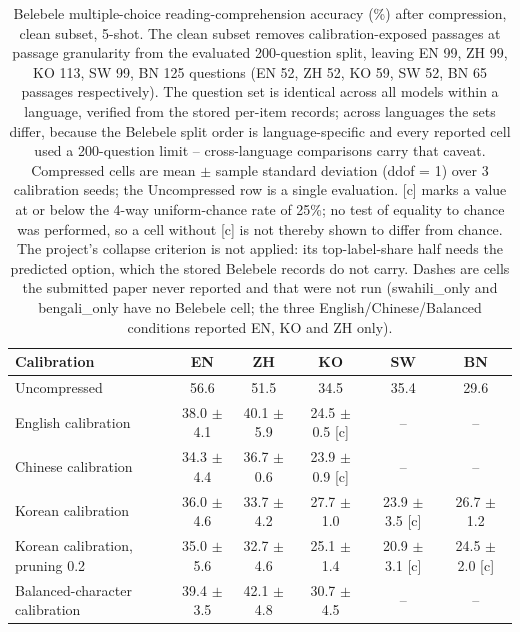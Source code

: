 \begin{table}[t]
\centering
\small
\begin{tabular}{lccccc}
\toprule
Calibration & EN & ZH & KO & SW & BN \\
\midrule
Uncompressed & 56.6 & 51.5 & 34.5 & 35.4 & 29.6 \\
English calibration & 38.0 $\pm$ 4.1 & 40.1 $\pm$ 5.9 & 24.5 $\pm$ 0.5 [c] & -- & -- \\
Chinese calibration & 34.3 $\pm$ 4.4 & 36.7 $\pm$ 0.6 & 23.9 $\pm$ 0.9 [c] & -- & -- \\
Korean calibration & 36.0 $\pm$ 4.6 & 33.7 $\pm$ 4.2 & 27.7 $\pm$ 1.0 & 23.9 $\pm$ 3.5 [c] & 26.7 $\pm$ 1.2 \\
Korean calibration, pruning 0.2 & 35.0 $\pm$ 5.6 & 32.7 $\pm$ 4.6 & 25.1 $\pm$ 1.4 & 20.9 $\pm$ 3.1 [c] & 24.5 $\pm$ 2.0 [c] \\
Balanced-character calibration & 39.4 $\pm$ 3.5 & 42.1 $\pm$ 4.8 & 30.7 $\pm$ 4.5 & -- & -- \\
\bottomrule
\end{tabular}
\caption{Belebele multiple-choice reading-comprehension accuracy (\%) after compression, clean subset, 5-shot. The clean subset removes calibration-exposed passages at passage granularity from the evaluated 200-question split, leaving EN 99, ZH 99, KO 113, SW 99, BN 125 questions (EN 52, ZH 52, KO 59, SW 52, BN 65 passages respectively). The question set is identical across all models within a language, verified from the stored per-item records; across languages the sets differ, because the Belebele split order is language-specific and every reported cell used a 200-question limit -- cross-language comparisons carry that caveat. Compressed cells are mean $\pm$ sample standard deviation (ddof = 1) over 3 calibration seeds; the Uncompressed row is a single evaluation. [c] marks a value at or below the 4-way uniform-chance rate of 25\%; no test of equality to chance was performed, so a cell without [c] is not thereby shown to differ from chance. The project's collapse criterion is not applied: its top-label-share half needs the predicted option, which the stored Belebele records do not carry. Dashes are cells the submitted paper never reported and that were not run (swahili\_only and bengali\_only have no Belebele cell; the three English/Chinese/Balanced conditions reported EN, KO and ZH only).}
\label{tab:belebele-clean}
\end{table}

